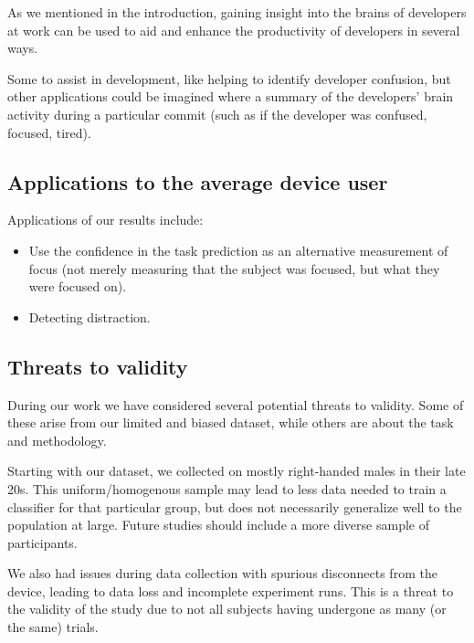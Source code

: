 As we mentioned in the introduction, gaining insight into the brains of developers at work can be used to aid and enhance the productivity of developers in several ways.

Some to assist in development, like helping to identify developer confusion, but other applications could be imagined where a summary of the developers' brain activity during a particular commit (such as if the developer was confused, focused, tired).


\subsection{Applications to the average device user}


Applications of our results include:

\begin{itemize}
    \item Use the confidence in the task prediction as an alternative measurement of focus (not merely measuring that the subject was focused, but what they were focused on). 
    \item Detecting distraction.
\end{itemize}

\subsection{Threats to validity}\label{section:threats}

    During our work we have considered several potential threats to validity. Some of these arise from our limited and biased dataset, while others are about the task and methodology.

    Starting with our dataset, we collected on mostly right-handed males in their late 20s. This uniform/homogenous sample may lead to less data needed to train a classifier for that particular group, but does not necessarily generalize well to the population at large. Future studies should include a more diverse sample of participants.

    We also had issues during data collection with spurious disconnects from the device, leading to data loss and incomplete experiment runs. This is a threat to the validity of the study due to not all subjects having undergone as many (or the same) trials.

